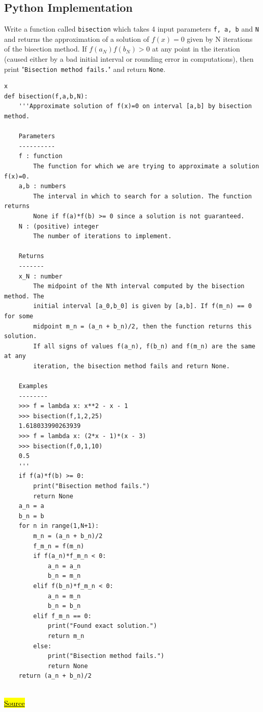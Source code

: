 \documentclass[a4paper, 12pt, reqno]{article}
\begin{document}
\subsection{Python Implementation}
Write a function called \texttt{bisection} which takes 4 input parameters \texttt{f, a, b} and \texttt{N} and returns the approximation of a solution of $f(x)=0$ given by N iterations of the bisection method. If  $f(a_N)f(b_N)>0$ at any point in the iteration (caused either by a bad initial interval or rounding error in computations), then print "\texttt{Bisection method fails.}" and return \texttt{None}.
\begin{lstlisting}[frame=single]  % Start your code-block
x
def bisection(f,a,b,N):
    '''Approximate solution of f(x)=0 on interval [a,b] by bisection method.

    Parameters
    ----------
    f : function
        The function for which we are trying to approximate a solution f(x)=0.
    a,b : numbers
        The interval in which to search for a solution. The function returns
        None if f(a)*f(b) >= 0 since a solution is not guaranteed.
    N : (positive) integer
        The number of iterations to implement.

    Returns
    -------
    x_N : number
        The midpoint of the Nth interval computed by the bisection method. The
        initial interval [a_0,b_0] is given by [a,b]. If f(m_n) == 0 for some
        midpoint m_n = (a_n + b_n)/2, then the function returns this solution.
        If all signs of values f(a_n), f(b_n) and f(m_n) are the same at any
        iteration, the bisection method fails and return None.

    Examples
    --------
    >>> f = lambda x: x**2 - x - 1
    >>> bisection(f,1,2,25)
    1.618033990263939
    >>> f = lambda x: (2*x - 1)*(x - 3)
    >>> bisection(f,0,1,10)
    0.5
    '''
    if f(a)*f(b) >= 0:
        print("Bisection method fails.")
        return None
    a_n = a
    b_n = b
    for n in range(1,N+1):
        m_n = (a_n + b_n)/2
        f_m_n = f(m_n)
        if f(a_n)*f_m_n < 0:
            a_n = a_n
            b_n = m_n
        elif f(b_n)*f_m_n < 0:
            a_n = m_n
            b_n = b_n
        elif f_m_n == 0:
            print("Found exact solution.")
            return m_n
        else:
            print("Bisection method fails.")
            return None
    return (a_n + b_n)/2


\end{lstlisting}

\href{https://personal.math.ubc.ca/~pwalls/math-python/roots-optimization/bisection/}{\hl{Source}}
\end{document}
